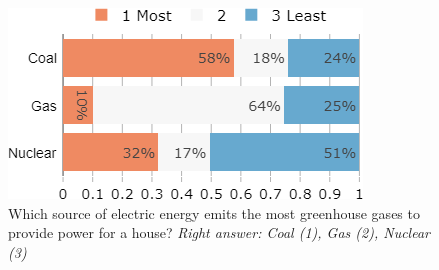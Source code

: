 \begin{framefont}{\small}
\begin{frame}{}%
	\begin{figure}
	\caption{Which source of electric energy emits the most greenhouse gases to provide power for a house?
	\newline \footnotesize{\textit{Right answer: Coal (1), Gas (2), Nuclear (3)}}}
	\includegraphics[width=.43\paperwidth]{../figures/FR/footprint_elec_FR.png}
	\end{figure}
\end{frame}
	

\end{framefont}
